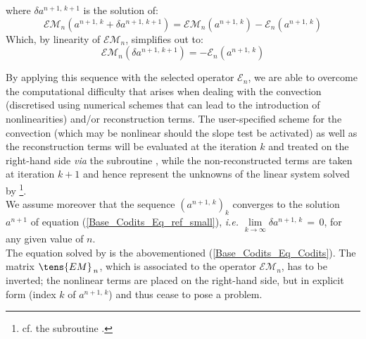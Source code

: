 where $\delta a^{n+1,\,k+1}$ is the solution of:
\begin{equation}
\mathcal{EM}_{n}(a^{n+1,\,k} + \delta a^{n+1,\,k+1}) = \mathcal{EM}_{n}(a^{n+1,\,k}) - \mathcal{E}_{n}(a^{n+1,\,k})
\end{equation}
Which, by linearity of $\mathcal{EM}_{n}$, simplifies out to:
\begin{equation}
\mathcal{EM}_{n}(\delta a^{n+1,\,k+1}) = - \mathcal{E}_{n}(a^{n+1,\,k})
\label{Base_Codits_Eq_Codits}
\end{equation}

By applying this sequence with the selected operator $\mathcal{E}_{n}$, we
are able to overcome the computational difficulty that arises when dealing
with the convection (discretised using numerical schemes that can lead to the
introduction of nonlinearities) and/or reconstruction terms. The user-specified scheme for the
convection (which may be nonlinear should the slope test be activated) as
well as the reconstruction terms will be evaluated at the iteration $k$ and treated on the right-hand side {\it via} the subroutine , while the non-reconstructed terms are taken at iteration $k+1$ and hence represent the unknowns
of the linear system solved by \footnote{cf. the subroutine
.}.\\

We assume moreover that the sequence $(a^{n+1,\,k})_k$ converges to the solution
$a^{n+1}$ of equation (\ref{Base_Codits_Eq_ref_small}), {\it i.e.}
$\lim\limits_{k\rightarrow\infty} \delta a^{n+1,\,k}\,=\,0$, for any given value of $n$.\\
The equation solved by  is the abovementioned (\ref{Base_Codits_Eq_Codits}). The
matrix $\tens{EM}_{\,n}$, which is associated to the operator $\mathcal{EM}_{n}$, has to be
inverted; the nonlinear terms are placed on the right-hand side, but in explicit form
(index $k$ of $a^{n+1,\,k}$) and thus cease to pose a problem.

